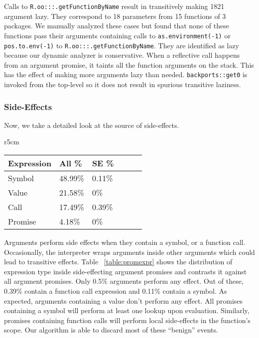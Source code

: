 \documentclass[review,nonacm,screen,acmsmall,anonymous=true]{acmart}
\newcommand{\code}[1]{\lstinline |#1|\xspace}
\begin{document}
%
Calls to \code{R.oo:::.getFunctionByName} result in transitively making 1821
argument lazy. They correspond to 18 parameters from 15 functions of 3 packages.
We manually analyzed these cases but found that none of these functions pass
their arguments containing calls to \code{as.environment(-1)} or
\code{pos.to.env(-1)} to \code{R.oo:::.getFunctionByName}. They are identified
as lazy because our dynamic analyzer is conservative. When a reflective call
happens from an argument promise, it taints all the function arguments on the
stack. This has the effect of making more arguments lazy than needed.
%
\code{backports::get0} is invoked from the top-level so it does not result in
spurious transitive laziness.

\subsubsection{Side-Effects}

Now, we take a detailed look at the source of side-effects.
%
\begin{wraptable}{r}{5cm}
  \vspace{-3mm}
  \small
  \caption{Promise Expression} \label{table:promexpr}
  \centering
  \begin{tabular}{llllll}
    \toprule
    \textbf{Expression}&\textbf{All \%}&\textbf{SE \%}\\
    \midrule
    Symbol&48.99\%&0.11\%\\
    Value&21.58\%&0\%\\
    Call&17.49\%&0.39\%\\
    Promise&4.18\%&0\%\\
    \bottomrule
  \end{tabular}
\end{wraptable}
%
Arguments perform side effects when they contain a symbol, or a function call.
Occasionally, the interpreter wraps arguments inside other arguments which could
lead to transitive effects. Table ~\ref{table:promexpr} shows the distribution
of expression type inside side-effecting argument promises and contrasts it
against all argument promises. Only 0.5\% arguments perform any effect. Out of
these, 0.39\% contain a function call expression and 0.11\% contain a symbol. As
expected, arguments containing a value don't perform any effect. All promises
containing a symbol will perform at least one lookup upon evaluation. Similarly,
promises containing function calls will perform local side-effects in the
function's scope. Our algorithm is able to discard most of these ``benign''
events.
\end{document}
